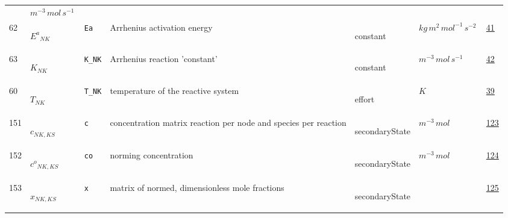 \begin{longtable}{|p{1cm}|p{2.5cm}|p{4.5cm}|p{8cm}|p{3.0cm}|p{3cm}|p{1cm}|}
             & $ m^{-3} \,mol \,s^{-1} \, $
             & \\
            62
             & \hypertarget{"v:62"}{ $ {{E^a}}{_{{N K}}} $}
             & \verb|Ea|
             & Arrhenius activation energy
             & \begin{lay}constant \end{lay}
             & $ kg \,m^{2} \,mol^{-1} \,s^{-2} \, $
             &                 \hyperlink{"e:41"}{ 41 }
                 \\
            63
             & \hypertarget{"v:63"}{ $ {K}{_{{N K}}} $}
             & \verb|K_NK|
             & Arrhenius reaction 'constant'
             & \begin{lay}constant \end{lay}
             & $ m^{-3} \,mol \,s^{-1} \, $
             &                 \hyperlink{"e:42"}{ 42 }
                 \\
            60
             & \hypertarget{"v:60"}{ $ {T}{_{{N K}}} $}
             & \verb|T_NK|
             & temperature of the reactive system
             & \begin{lay}effort \end{lay}
             & $ K \, $
             &                 \hyperlink{"e:39"}{ 39 }
                 \\
            151
             & \hypertarget{"v:151"}{ $ {c}{_{{N K}, {K S}}} $}
             & \verb|c|
             & concentration matrix reaction per node and species per reaction
             & \begin{lay}secondaryState \end{lay}
             & $ m^{-3} \,mol \, $
             &                 \hyperlink{"e:123"}{ 123 }
                 \\
            152
             & \hypertarget{"v:152"}{ $ {{c^o}}{_{{N K}, {K S}}} $}
             & \verb|co|
             & norming concentration
             & \begin{lay}secondaryState \end{lay}
             & $ m^{-3} \,mol \, $
             &                 \hyperlink{"e:124"}{ 124 }
                 \\
            153
             & \hypertarget{"v:153"}{ $ {x}{_{{N K}, {K S}}} $}
             & \verb|x|
             & matrix of normed, dimensionless mole fractions 
             & \begin{lay}secondaryState \end{lay}
             & $  $
             &                 \hyperlink{"e:125"}{ 125 }

\end{longtable}
